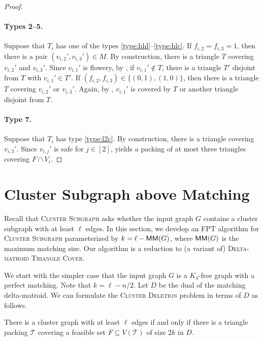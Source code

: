 \begin{proof}
  \paragraph*{Types 2--5.}
    Suppose that $T_i$ has one of the types \ref{type:hhl}--\ref{type:hlc}.
    If $f_{i,2} = f_{i,3} = 1$, then there is a pair $(v_{i,2}', v_{i,3}') \in M$.
    By construction, there is a triangle $T$ covering $v_{i,2}'$ and $v_{i,3}'$.
    Since $v_{i,1}'$ is flowery, by , if $v_{i,1}' \notin T$, there is a triangle $T'$  disjoint from $T$ with $v_{i,1}' \in T'$. 
    If $(f_{i,2}, f_{i,3}) \in \{ (0, 1), (1, 0) \}$, then there is a triangle $T$ covering $v_{i,2}'$ or $v_{i,3}'$.
    Again, by , $v_{i,1}'$ is covered by $T$ or another triangle disjoint from $T$.
  \paragraph*{Type 7.}
    Suppose that $T_i$ has type \ref{type:l2c}.
    By construction, there is a triangle covering $v_{i,3}'$.
    Since $v_{i,j}'$ is safe for $j \in [2]$,  yields a packing of at most three triangles covering $F \cap V_i$.
\end{proof}


\section{Cluster Subgraph above Matching} \label{sec:cs-above-matching}

Recall that \textsc{Cluster Subgraph} asks whether the input graph $G$ contains a cluster subgraph with at least $\ell$ edges.
In this section, we develop an FPT algorithm for \textsc{Cluster Subgraph} parameterized by $k = \ell - \mathsf{MM}(G)$, where $\mathsf{MM}(G)$ is the maximum matching size.
Our algorithm is a reduction to (a variant of) \textsc{Delta-matroid Triangle Cover}.

\csam*

We start with the simpler case that the input graph $G$ is a $K_4$-free graph with a perfect matching.
Note that $k = \ell - n/2$.
Let $D$ be the dual of the matching delta-matroid.
We can formulate the \textsc{Cluster Deletion} problem in terms of $D$ as follows.

\begin{lemma}
  \label{lemma:ce-feasible-cover}
  There is a cluster graph with at least $\ell$ edges if and only if there is a triangle packing $\mathcal{T}$ covering a feasible set $F \subseteq V(\mathcal{T})$ of size $2k$ in $D$.
\end{lemma}

